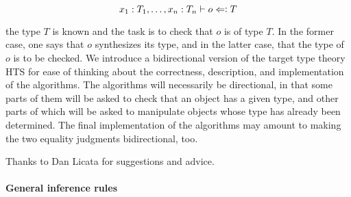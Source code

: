 \documentclass[11pt]{article}
\newcommand{\force}{\Leftarrow\vcentcolon}
\begin{document}
$$x_1:T_1,\dots,x_n:T_n\vdash o \force T$$

the type $T$ is known and the task is to check that $o$ is of type $T$.  In the
former case, one says that $o$ synthesizes its type, and in the latter case,
that the type of $o$ is to be checked.  We introduce a bidirectional version of
the target type theory HTS for ease of thinking about the correctness,
description, and implementation of the algorithms.  The algorithms will
necessarily be directional, in that some parts of them will be asked to check
that an object has a given type, and other parts of which will be asked to
manipulate objects whose type has already been determined.  The final
implementation of the algorithms may amount to making the two equality
judgments bidirectional, too.

Thanks to Dan Licata for suggestions and advice.

\paragraph{General inference rules} 
\end{document}
